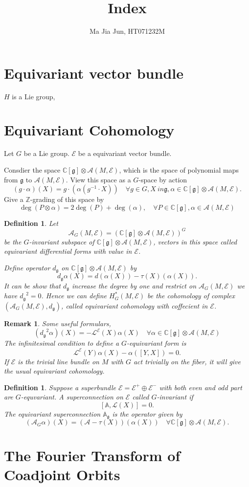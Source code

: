 \documentclass[11pt]{amsart}
\title{Index}
\author{Ma Jia Jun, HT071232M}
\newtheorem{Def}[Thm]{Definition}
\newtheorem{Rmk}[Thm]{Remark}
\def\cA{{\mathcal{A}}}
\def\cAg{{\mathcal{A}_G}}
\def\cL{{\mathcal{L}}}
\def\cE{{\mathcal{E}}}
\def\bC{{\mathbb{C}}}
\def\bA{{\mathbb{A}}}
\def\bAg{{\mathbb{A}_\mathfrak{g}}}
\def\fgg{{\mathfrak{g}}}
\def\bZ{{\mathbb{Z}}}
\def\dg{{d_{\fgg}}}
\begin{document}
\maketitle

\section{Equivariant vector bundle}

$H$ is a Lie group, 

\section{Equivariant Cohomology}
Let $G$ be a Lie group. 
$\cE$ be a equivariant vector bundle. 

Consdier the space $\bC[\fgg]\otimes \cA(M,\cE)$, which is the space of polynomial maps from $\fgg$ to $\cA(M,\cE)$. View this space as a $G$-space by action
\[
(g\cdot \alpha)(X) = g\cdot (\alpha (g^{-1}\cdot X)) \quad \forall g\in G,
X\ in \fgg, \alpha \in \bC[\fgg]\otimes \cA(M,\cE).
\]
Give a $\bZ$-grading of this space by 
\[
\deg(P\otimes \alpha) = 2\deg(P)+\deg(\alpha), 
\quad \forall P\in \bC[\fgg], \alpha \in \cA(M,\cE)
\]

\begin{Def}
Let 
\[
\cA_G(M,\cE) = \left(\bC[\fgg]\otimes \cA(M,\cE)\right)^G
\]
be the $G$-invariant subspace of $\bC[\fgg]\otimes \cA(M,\cE)$, vectors in this space called equivariant differential forms with value in $\cE$.

Define operator $\dg$ on $\bC[\fgg]\otimes \cA(M,\cE)$ by
\[
\dg \alpha(X) = d(\alpha(X)) - \tau(X)(\alpha(X)).
\]
It can be show that $\dg$ increase the degree by one and restrict on 
$\cAg(M,\cE)$ we have $\dg^2= 0$. Hence we can define
$H_G^*(M,\cE)$ be the cohomology of complex $\left(\cAg(M,\cE),\dg\right)$, 
called equivariant cohomology with coffecient in $\cE$. 
\end{Def}

\begin{Rmk}
Some useful formulars, 
\[
(\dg^2 \alpha)(X) = - \cL^\cE(X)\alpha(X)\quad \forall \alpha
\in \bC[\fgg]\otimes \cA(M,\cE)
\]
The infinitesimal condition to define a $G$-equivariant form is 
\[
\cL^\cE(Y)\alpha(X) - \alpha([Y,X]) = 0.
\]
If $\cE$ is the trivial line bundle on $M$ with $G$ act trivially on the fiber, it will give the usual equivariant cohomology.
\end{Rmk}


\begin{Def}
Suppose a superbundle $\cE = \cE^+\oplus \cE^-$ 
with both even and odd part are $G$-equvariant.
A superconnection on $\cE$ called $G$-invariant if 
\[
[\bA,\cL(X)]=0.
\]
The equivariant superconnection $\bAg$ is the operator given by 
\[
(\cAg \alpha)(X) = (\cA-\tau(X))(\alpha(X)) \quad \forall  \bC[\fgg]\otimes \cA(M,\cE).
\]
\end{Def}


\section{The Fourier Transform of Coadjoint Orbits}
\end{document}
